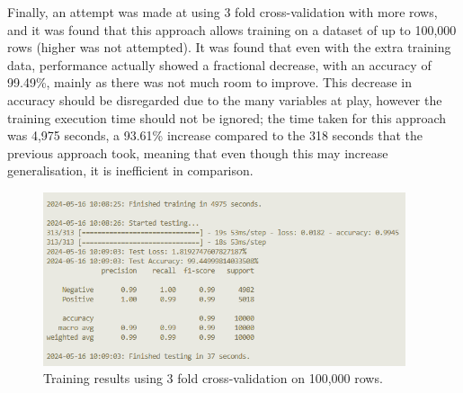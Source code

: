     Finally, an attempt was made at using 3 fold cross-validation with more rows, and it was found that this approach allows training on a dataset of up to 100,000 rows (higher was not attempted). It was found that even with the extra training data, performance actually showed a fractional decrease, with an accuracy of 99.49\%, mainly as there was not much room to improve. This decrease in accuracy should be disregarded due to the many variables at play, however the training execution time should not be ignored; the time taken for this approach was 4,975 seconds, a 93.61\% increase compared to the 318 seconds that the previous approach took, meaning that even though this may increase generalisation, it is inefficient in comparison.

    \FloatBarrier
    \begin{figure}[h]
        \centering
        \includegraphics[width=0.95\textwidth]{figures/cross_validation_100000_console_overall_3f.png}
        \caption{Training results using 3 fold cross-validation on 100,000 rows.}
    \end{figure}

